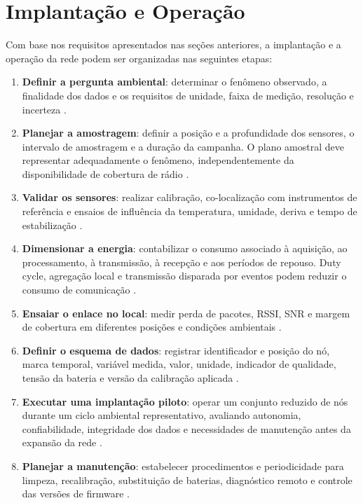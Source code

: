 \section{Implantação e Operação}

Com base nos requisitos apresentados nas seções anteriores, a implantação e a operação da rede podem ser organizadas nas seguintes etapas:

\begin{enumerate}
    \item \textbf{Definir a pergunta ambiental}: determinar o fenômeno observado, a finalidade dos dados e os requisitos de unidade, faixa de medição, resolução e incerteza \cite{HART2006177,5597912}.

    \item \textbf{Planejar a amostragem}: definir a posição e a profundidade dos sensores, o intervalo de amostragem e a duração da campanha. O plano amostral deve representar adequadamente o fenômeno, independentemente da disponibilidade de cobertura de rádio \cite{HART2006177,5597912}.

    \item \textbf{Validar os sensores}: realizar calibração, co-localização com instrumentos de referência e ensaios de influência da temperatura, umidade, deriva e tempo de estabilização \cite{5597912,10.1145/3005719,atmos10090506,KANG2022151769}.

    \item \textbf{Dimensionar a energia}: contabilizar o consumo associado à aquisição, ao processamento, à transmissão, à recepção e aos períodos de repouso. Duty cycle, agregação local e transmissão disparada por eventos podem reduzir o consumo de comunicação \cite{ANASTASI2009537,s23146332}.

    \item \textbf{Ensaiar o enlace no local}: medir perda de pacotes, RSSI, SNR e margem de cobertura em diferentes posições e condições ambientais \cite{10.1145/1134680.1134685,8030482,s23146332}.

    \item \textbf{Definir o esquema de dados}: registrar identificador e posição do nó, marca temporal, variável medida, valor, unidade, indicador de qualidade, tensão da bateria e versão da calibração aplicada \cite{YICK20082292,5597912,10.1145/1031495.1031521}.

    \item \textbf{Executar uma implantação piloto}: operar um conjunto reduzido de nós durante um ciclo ambiental representativo, avaliando autonomia, confiabilidade, integridade dos dados e necessidades de manutenção antes da expansão da rede \cite{5597912,10.1145/1031495.1031521,10.1145/1134680.1134685}.

    \item \textbf{Planejar a manutenção}: estabelecer procedimentos e periodicidade para limpeza, recalibração, substituição de baterias, diagnóstico remoto e controle das versões de firmware \cite{5597912,10.1145/1031495.1031521,10.1145/3005719}.
\end{enumerate}

